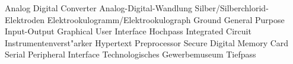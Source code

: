  {Analog Digital Converter}
 {Analog-Digital-Wandlung}
 {Silber/Silberchlorid-Elektroden}
 {Elektrookulogramm/Elektrookulograph}
 {Ground}
 {General Purpose Input-Output}
 {Graphical User Interface}
 {Hochpass}
 {Integrated Circuit}
 {Instrumentenverst"arker}
 {Hypertext Preprocessor}
 {Secure Digital Memory Card}
 {Serial Peripheral Interface}
 {Technologisches Gewerbemuseum}
 {Tiefpass}
